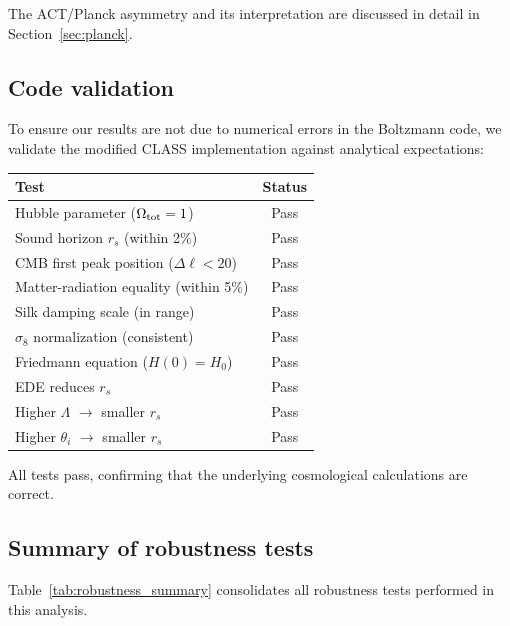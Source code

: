 \documentclass[onecolumn,showpacs,preprintnumbers,amsmath,amssymb,prd]{revtex4-2}
\begin{document}
The ACT/Planck asymmetry and its interpretation are discussed in detail 
in Section~\ref{sec:planck}.

\subsection{Code validation}

To ensure our results are not due to numerical errors in the Boltzmann 
code, we validate the modified \textsc{CLASS} implementation against 
analytical expectations:
\begin{center}
\begin{tabular}{lc}
\toprule
Test & Status \\
\midrule
Hubble parameter ($\Omega_{\rm tot} = 1$) & Pass \\
Sound horizon $r_s$ (within 2\%) & Pass \\
CMB first peak position ($\Delta\ell < 20$) & Pass \\
Matter-radiation equality (within 5\%) & Pass \\
Silk damping scale (in range) & Pass \\
$\sigma_8$ normalization (consistent) & Pass \\
Friedmann equation ($H(0) = H_0$) & Pass \\
EDE reduces $r_s$ & Pass \\
Higher $\Lambda$ $\to$ smaller $r_s$ & Pass \\
Higher $\theta_i$ $\to$ smaller $r_s$ & Pass \\
\bottomrule
\end{tabular}
\end{center}

All tests pass, confirming that the underlying cosmological calculations 
are correct.

\subsection{Summary of robustness tests}

Table~\ref{tab:robustness_summary} consolidates all robustness tests 
performed in this analysis.
\end{document}
